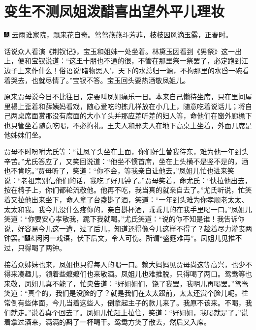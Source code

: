 

\chapter{变生不测凤姐泼醋\hspace{.5em}喜出望外平儿理妆}

{\includegraphics[width=3mm]{../Images/00005}  \kaishu 云雨谁家院，飘来花自奇。莺莺燕燕斗芳菲，枝枝因风滴玉露，正春时。}

话说众人看演《荆钗记》，宝玉和姐妹一处坐着。林黛玉因看到《男祭》这一出上，便和宝钗说道：“这王十朋也不通的很，不管在那里祭一祭罢了，必定跑到江边子上来作什么！俗语说‘睹物思人’，天下的水总归一源，不拘那里的水舀一碗看着哭去，也就尽情了。”宝钗不答。宝玉回头要热酒敬凤姐儿。

原来贾母说今日不比往日，定要叫凤姐痛乐一日。本来自己懒待坐席，只在里间屋里榻上歪着和薛姨妈看戏，随心爱吃的拣几样放在小几上，随意吃着说话儿；将自己两桌席面赏那没有席面的大小丫头并那应差听差的妇人等，命他们在窗外廊檐下也只管坐着随意吃喝，不必拘礼。王夫人和邢夫人在地下高桌上坐着，外面几席是他姊妹们坐。

贾母不时吩咐尤氏等：“让凤丫头坐在上面，你们好生替我待东，难为他一年到头辛苦。”尤氏答应了，又笑回说道：“他坐不惯首席，坐在上头横不是竖不是的，酒也不肯吃。”贾母听了，笑道：“你不会，等我亲自让他去。”凤姐儿忙也进来笑说：“老祖宗别信他们的话，我吃了好几钟了。”贾母笑着，命尤氏：“快拉他出去，按在椅子上，你们都轮流敬他。他再不吃，我当真的就亲自去了。”尤氏听说，忙笑着又拉他出来坐下，命人拿了台盏斟了酒，笑道：“一年到头难为你孝顺老太太、太太和我。我今儿没什么疼你的，亲自斟杯酒，乖乖儿的在我手里喝一口。”凤姐儿笑道：“你要安心孝敬我，跪下我就喝。”尤氏笑道：“说的你不知是谁！我告诉你说，好容易今儿这一遭，过了后儿，知道还得像今儿这样不得了？趁着尽力灌丧两钟罢。”{\includegraphics[width=3mm]{../Images/00004}\includegraphics[width=3mm]{../Images/00012}\footnotesize \kaishu 闲闲一戏语，伏下后文，令人可伤。所谓“盛筵难再”。}凤姐儿见推不过，只得喝了两钟。

接着众姊妹也来，凤姐也只得每人的喝一口。赖大妈妈见贾母尚这等高兴，也少不得来凑趣儿，领着些嬷嬷们也来敬酒。凤姐儿也难推脱，只得喝了两口。鸳鸯等也来敬，凤姐儿真不能了，忙央告道：“好姐姐们，饶了我罢，我明儿再喝罢。”鸳鸯笑道：“真个的，我们是没脸的了？就是我们在太太跟前，太太还赏个脸儿呢。往常倒有些体面，今儿当着这些人，倒拿起主子的款儿来了。我原不该来。不喝，我们就走。”说着真个回去了。凤姐儿忙赶上拉住，笑道：“好姐姐，我喝就是了。”说着拿过酒来，满满的斟了一杯喝干。鸳鸯方笑了散去，然后又入席。


